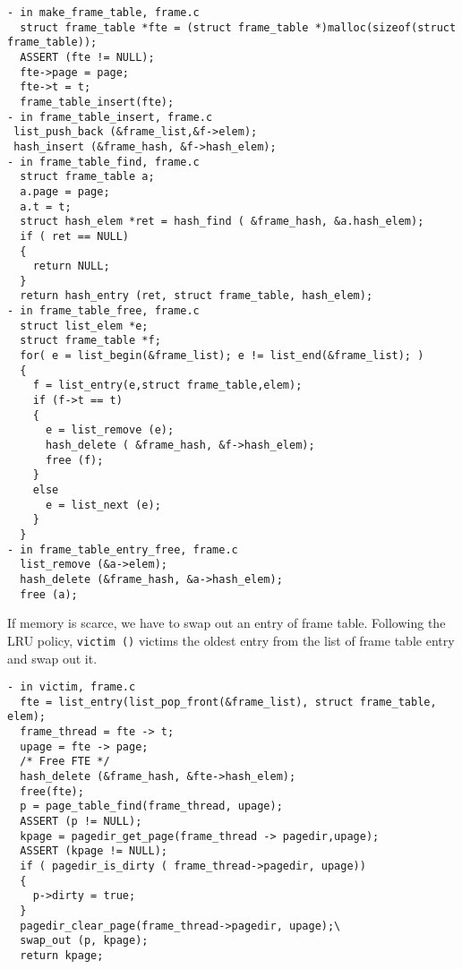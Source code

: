 \documentclass[a4paper,article,11pt,oneside]{article}
\begin{document}
\begin{verbatim}
- in make_frame_table, frame.c
  struct frame_table *fte = (struct frame_table *)malloc(sizeof(struct frame_table));
  ASSERT (fte != NULL);
  fte->page = page;
  fte->t = t;
  frame_table_insert(fte);
- in frame_table_insert, frame.c
 list_push_back (&frame_list,&f->elem);
 hash_insert (&frame_hash, &f->hash_elem);
- in frame_table_find, frame.c
  struct frame_table a;
  a.page = page;
  a.t = t;
  struct hash_elem *ret = hash_find ( &frame_hash, &a.hash_elem);
  if ( ret == NULL)
  {
    return NULL;
  }
  return hash_entry (ret, struct frame_table, hash_elem);
- in frame_table_free, frame.c
  struct list_elem *e;
  struct frame_table *f;
  for( e = list_begin(&frame_list); e != list_end(&frame_list); )
  {
    f = list_entry(e,struct frame_table,elem);      
    if (f->t == t)
    {
      e = list_remove (e);
      hash_delete ( &frame_hash, &f->hash_elem);
      free (f);
    }
    else
      e = list_next (e);
    }
  }
- in frame_table_entry_free, frame.c
  list_remove (&a->elem);
  hash_delete (&frame_hash, &a->hash_elem);
  free (a);
\end{verbatim}
If memory is scarce, we have to swap out an entry of frame
table. Following the LRU policy, \texttt{victim ()} victims the oldest
entry from the list of frame table entry and swap out it.
\begin{verbatim}
- in victim, frame.c
  fte = list_entry(list_pop_front(&frame_list), struct frame_table, elem);
  frame_thread = fte -> t;
  upage = fte -> page;
  /* Free FTE */
  hash_delete (&frame_hash, &fte->hash_elem);
  free(fte);
  p = page_table_find(frame_thread, upage);
  ASSERT (p != NULL);
  kpage = pagedir_get_page(frame_thread -> pagedir,upage);
  ASSERT (kpage != NULL);
  if ( pagedir_is_dirty ( frame_thread->pagedir, upage)) 
  {
    p->dirty = true;
  }
  pagedir_clear_page(frame_thread->pagedir, upage);\
  swap_out (p, kpage);
  return kpage;
\end{verbatim}
\end{document}
